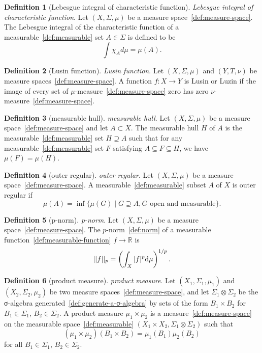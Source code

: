 \documentclass[12pt,a4paper]{article}
\theoremstyle{definition}
\newtheorem{definition}{Definition}
\begin{document}
\begin{definition}[Lebesgue integral of characteristic function]\label{def:lebesgue-integral-of-characteristic-function}
\emph{Lebesgue integral of characteristic function}. Let $(X, \Sigma, \mu)$ be a measure space~\ref{def:measure-space}. The Lebesgue integral of the characteristic function of a measurable~\ref{def:measurable} set $A \in \Sigma$ is defined to be $$\int \chi_Ad\mu = \mu(A).$$
\end{definition}

\begin{definition}[Lusin function]\label{def:lusin-function}
\emph{Lusin function}. Let $(X,\Sigma, \mu)$ and $(Y, T, \nu)$ be measure spaces~\ref{def:measure-space}. A function $f:X\to Y$ is Lusin or Luzin if the image of every set of $\mu$-measure~\ref{def:measure-space} zero has zero $\nu$-measure~\ref{def:measure-space}.
\end{definition}

\begin{definition}[measurable hull]\label{def:measurable-hull}
\emph{measurable hull}. Let $(X,\Sigma, \mu)$ be a measure space~\ref{def:measure-space} and let $A \subset X$. The measurable hull $H$ of $A$ is the measurable~\ref{def:measurable} set $H\supseteq A$ such that for any measurable~\ref{def:measurable} set $F$ satisfying $A\subseteq F\subseteq H$, we have $\mu(F) = \mu(H)$.
\end{definition}

\begin{definition}[outer regular]\label{def:outer-regular}
\emph{outer regular}. Let $(X,\Sigma,\mu)$ be a measure space~\ref{def:measure-space}. A measurable~\ref{def:measurable} subset $A$ of $X$ is outer regular if $$\mu(A) = \inf\{\mu(G) \mid G\supseteq A, G\text{ open and measurable}\}.$$
\end{definition}

\begin{definition}[p-norm]\label{def:p-norm}
\emph{p-norm}. Let $(X,\Sigma,\mu)$ be a measure space~\ref{def:measure-space}. The $p$-norm~\ref{def:norm} of a measurable function~\ref{def:measurable-function} $f \to \mathbb R$ is $$\vert \vert f\vert \vert _p = \left(\int_X \vert f\vert ^p\text d\mu\right)^{1/p}.$$
\end{definition}

\begin{definition}[product measure]\label{def:product-measure}
\emph{product measure}. Let $(X_1,\Sigma_1,\mu_1)$ and $(X_2,\Sigma_2,\mu_2)$ be two measure spaces~\ref{def:measure-space}, and let $\Sigma_1\otimes \Sigma_2$ be the σ-algebra generated~\ref{def:generate-a-σ-algebra} by sets of the form $B_1\times B_2$ for $B_1\in \Sigma_1$, $B_2\in \Sigma_2$. A product measure $\mu_1\times \mu_2$ is a measure~\ref{def:measure-space} on the measurable space~\ref{def:measurable} $(X_1\times X_2, \Sigma_1\otimes\Sigma_2)$ such that $$(\mu_1\times\mu_2)(B_1\times B_2) = \mu_1(B_1)\mu_2(B_2)$$ for all $B_1\in \Sigma_1$, $B_2\in \Sigma_2$.
\end{definition}
\end{document}
